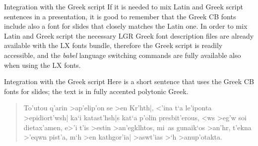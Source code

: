 \documentclass[usepdftitle=false]{beamer}\errorcontextlines=9
\newcommand\pack[1]{\textsl{#1}}
\begin{document}
\begin{frame}{Integration with the Greek script}
If it is needed to mix Latin and Greek script sentences in a presentation, it is good to remember that the Greek CB fonts include also  a font for slides that closely matches the Latin one. In order to mix Latin and Greek script the necessary  LGR Greek font description files are already available with the LX fonts bundle, therefore the Greek script is readily accessible, and the \pack{babel} language switching commands are fully available also when using the LX fonts.
\end{frame}


\begin{frame}{Integration with the Greek script}
Here is a short sentence that uses the Greek CB fonts for slides; the text is in fully accented polytonic Greek.

\begin{quote}
\begin{otherlanguage}{greek}\selectfont
To'utou q'arin >ap'elip'on se >en Kr'hth|, <'ina t`a le'iponta
>epidiort'wsh| ka`i katast'hsh|s kat`a p'olin presbit'erous, <ws
>eg'w soi dietax'amen, e>'i t'is >estin >an'egklhtos, mi~as
gunaik`os >an'hr, t'ekna >'eqwn pist'a, m`h >en kathgor'ia|
>aswt'ias >`h >anup'otakta.\end{otherlanguage}\end{quote}
\end{frame}

\end{document}
